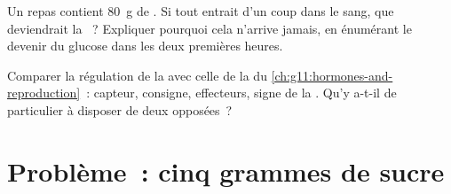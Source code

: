 \begin{exercise}[$\star\star\star$]\label{exo:g12:glucose-and-diabetes:14}
Un repas contient \qty{80}{g} de . Si tout entrait d'un coup
dans le sang, que deviendrait la ~? Expliquer pourquoi cela
n'arrive jamais, en énumérant le devenir du glucose dans les deux
premières heures.
\end{exercise}

\begin{exercise}[$\star\star\star$]\label{exo:g12:glucose-and-diabetes:15}
Comparer la régulation de la  avec celle de la  du
\cref{ch:g11:hormones-and-reproduction}~: capteur, consigne,
effecteurs, signe de la . Qu'y a-t-il de particulier à
disposer de deux  opposées~?
\end{exercise}

\section{Problème~: cinq grammes de sucre}

